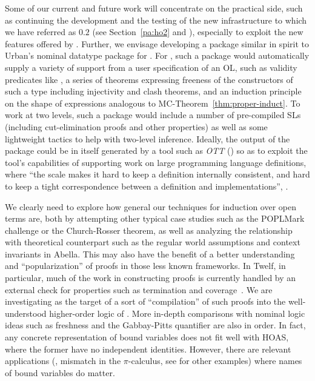 \documentclass[final]{svjour3}
\begin{document}
Some of our current and future work will concentrate on the practical
side, such as continuing the development and the testing of the new
infrastructure to which we have referred as {\hybrid $0.2$} (see
Section~\ref{pa:ho2} and \cite{MMF07}), especially to exploit the new
features offered by .
Further, we envisage developing a package similar in spirit to Urban's
nominal datatype package for \HOL \cite{Nominal}.  For \hybrid, such a
package would automatically supply a variety of support from a user
specification of an OL, such as validity predicates like ,
a series of theorems expressing freeness of the constructors of such a
type including injectivity and clash theorems, and an induction
principle on the shape of expressions analogous to
MC-Theorem~\ref{thm:proper-induct}.  To work at two levels, such a
package would include a number of pre-compiled SLs (including
cut-elimination proofs and other properties) as well as some
lightweight tactics to help with two-level inference. Ideally, the
output of the package could be in itself generated by a tool such as
\emph{OTT} (\cite{OTTpaper}) so as to exploit the tool's capabilities
of supporting work on large programming language definitions, where
``the scale makes it hard to keep a definition internally consistent,
and hard to keep a tight correspondence between a definition and
implementations'', \opcit.


\smallskip


We clearly need to explore how general our techniques for induction
over open terms \cite{FeltyM09} are, both by attempting other typical
case studies such as the POPLMark challenge or the Church-Rosser
theorem, as well as analyzing the relationship with theoretical
counterpart such as the regular world assumptions and context
invariants in Abella.  This may also have the benefit of a better
understanding and ``popularization'' of proofs in those less known
frameworks.  In Twelf, in particular, much of the work in  constructing
proofs is currently handled by an external check for properties such as
termination and coverage~\cite{SchurmannP03,Pientka05}.  We are
investigating \hybrid as the target of a sort of ``compilation'' of
such proofs into the well-understood higher-order logic of \HOL.  
More in-depth comparisons with nominal logic ideas such as freshness
and the Gabbay-Pitts quantifier are also in order. In fact, any
concrete representation of bound variables does not fit well with
HOAS, where the former have no independent identities.  However, there
are relevant applications (\eg, mismatch in the $\pi$-calculus, see
\cite{CheneyNLF} for other examples) where names of bound variables do
matter.
\end{document}
